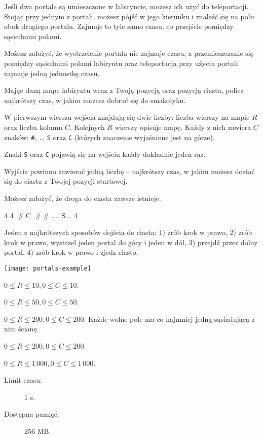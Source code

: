 \documentclass{boi2014-pl}
\newcommand{\constant}[1]{{\tt #1}}
\begin{document}
    Jeśli dwa portale są umieszczone w labiryncie, możesz ich użyć do teleportacji.
    Stojąc przy jednym z portali, możesz pójść w jego kierunku i znaleźć się na polu obok drugiego portalu.
    Zajmuje to tyle samo czasu, co przejście pomiędzy sąsiednimi polami.

    Możesz założyć, że wystrzelenie portalu nie zajmuje czasu, a przemieszczanie się pomiędzy sąsiednimi polami labiryntu oraz teleportacja przy użyciu portali zajmuje jedną jednostkę czasu.

    \Task
    Mając daną mape labiryntu wraz z Twoją pozycją oraz pozycją ciasta, policz najkrótszy czas, w jakim możesz dobrać się do smakołyku.

    \Input
    W pierwszym wierszu wejścia znajdują się dwie liczby: liczba wierszy na mapie $R$ oraz liczba kolumn $C$.
    Kolejnych $R$ wierszy opisuje mapę.
    Każdy z nich zawiera $C$ znaków: \constant{\#}, \constant{.}, \constant{S} oraz \constant{C} (których znaczenie wyjaśnione jest na górze).

    Znaki \constant{S} oraz \constant{C} pojawią się na wejściu każdy dokładnie jeden raz.

    \Output
    Wyjście powinno zawierać jedną liczbę -- najkrótszy czas, w jakim możesz dostać się do ciasta z Twojej pozycji startowej.

    Możesz założyć, że droga do ciasta zawsze istnieje.

    \Example
    \example
    {
        4 4\newline
        .\#.C\newline
        .\#.\#\newline
        ....\newline
        S...
    }
    {
        4
    }
    {
        Jeden z najkrótszych sposobów dojścia do ciasta: 1) zrób krok w prawo, 2) zrób krok w prawo, wystrzel jeden portal do góry i jeden w dół, 3) przejdź przez dolny portal, 4) zrób krok w prawo i zjedz ciasto.

        \begin{center}
            \texttt{[image: portals-example]}
        \end{center}
    }

    \Scoring

    \begin{description}[leftmargin=0pt]
        \item[Podzadanie 1 (? punktów):] $0 \le R \le 10, 0 \le C \le 10$.
        \item[Podzadanie 2 (? punktów):] $0 \le R \le 50, 0 \le C \le 50$.
        \item[Podzadanie 3 (? punktów):] $0 \le R \le 200, 0 \le C \le 200$.
        Każde wolne pole ma co najmniej jedną sąsiadującą z nim ścianę.
        \item[Podzadanie 4 (? punktów):] $0 \le R \le 200, 0 \le C \le 200$.
        \item[Podzadanie 5 (? punktów):] $0 \le R \le 1\,000, 0 \le C \le 1\,000$.
    \end{description}

    \Constraints

    \begin{description}
        \item[Limit czasu:] 1 s.
        \item[Dostępna pamięć:] 256 MB.
    \end{description}
\end{document}
